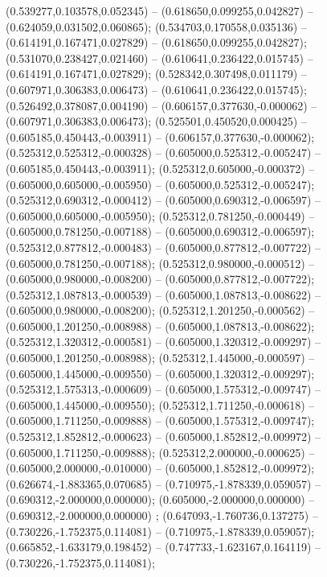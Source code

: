  (0.539277,0.103578,0.052345) -- (0.618650,0.099255,0.042827) -- (0.624059,0.031502,0.060865);
 (0.534703,0.170558,0.035136) -- (0.614191,0.167471,0.027829) -- (0.618650,0.099255,0.042827);
 (0.531070,0.238427,0.021460) -- (0.610641,0.236422,0.015745) -- (0.614191,0.167471,0.027829);
 (0.528342,0.307498,0.011179) -- (0.607971,0.306383,0.006473) -- (0.610641,0.236422,0.015745);
 (0.526492,0.378087,0.004190) -- (0.606157,0.377630,-0.000062) -- (0.607971,0.306383,0.006473);
 (0.525501,0.450520,0.000425) -- (0.605185,0.450443,-0.003911) -- (0.606157,0.377630,-0.000062);
 (0.525312,0.525312,-0.000328) -- (0.605000,0.525312,-0.005247) -- (0.605185,0.450443,-0.003911);
 (0.525312,0.605000,-0.000372) -- (0.605000,0.605000,-0.005950) -- (0.605000,0.525312,-0.005247);
 (0.525312,0.690312,-0.000412) -- (0.605000,0.690312,-0.006597) -- (0.605000,0.605000,-0.005950);
 (0.525312,0.781250,-0.000449) -- (0.605000,0.781250,-0.007188) -- (0.605000,0.690312,-0.006597);
 (0.525312,0.877812,-0.000483) -- (0.605000,0.877812,-0.007722) -- (0.605000,0.781250,-0.007188);
 (0.525312,0.980000,-0.000512) -- (0.605000,0.980000,-0.008200) -- (0.605000,0.877812,-0.007722);
 (0.525312,1.087813,-0.000539) -- (0.605000,1.087813,-0.008622) -- (0.605000,0.980000,-0.008200);
 (0.525312,1.201250,-0.000562) -- (0.605000,1.201250,-0.008988) -- (0.605000,1.087813,-0.008622);
 (0.525312,1.320312,-0.000581) -- (0.605000,1.320312,-0.009297) -- (0.605000,1.201250,-0.008988);
 (0.525312,1.445000,-0.000597) -- (0.605000,1.445000,-0.009550) -- (0.605000,1.320312,-0.009297);
 (0.525312,1.575313,-0.000609) -- (0.605000,1.575312,-0.009747) -- (0.605000,1.445000,-0.009550);
 (0.525312,1.711250,-0.000618) -- (0.605000,1.711250,-0.009888) -- (0.605000,1.575312,-0.009747);
 (0.525312,1.852812,-0.000623) -- (0.605000,1.852812,-0.009972) -- (0.605000,1.711250,-0.009888);
 (0.525312,2.000000,-0.000625) -- (0.605000,2.000000,-0.010000) -- (0.605000,1.852812,-0.009972);
 (0.626674,-1.883365,0.070685) -- (0.710975,-1.878339,0.059057) -- (0.690312,-2.000000,0.000000);
 (0.605000,-2.000000,0.000000) -- (0.690312,-2.000000,0.000000) ;
 (0.647093,-1.760736,0.137275) -- (0.730226,-1.752375,0.114081) -- (0.710975,-1.878339,0.059057);
 (0.665852,-1.633179,0.198452) -- (0.747733,-1.623167,0.164119) -- (0.730226,-1.752375,0.114081);
